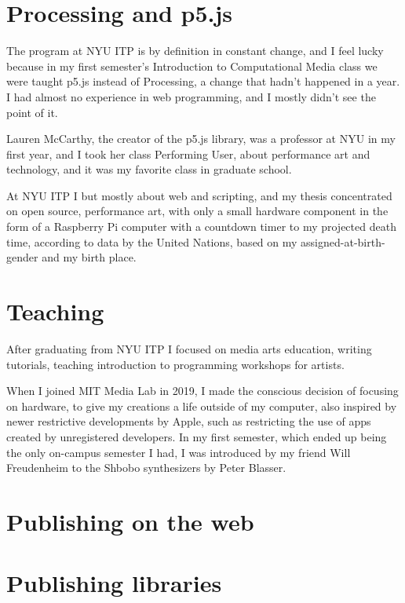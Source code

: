 \section{Processing and p5.js}

The program at \acrshort{NYU} \acrshort{ITP} is by definition in constant change, and I feel lucky because in my first semester's Introduction to Computational Media class we were taught p5.js instead of Processing, a change that hadn't happened in a year. I had almost no experience in web programming, and I mostly didn't see the point of it.

Lauren McCarthy, the creator of the p5.js library, was a professor at \acrshort{NYU} in my first year, and I took her class Performing User, about performance art and technology, and it was my favorite class in graduate school.

At \acrshort{NYU} \acrshort{ITP} I but mostly about web and scripting, and my thesis concentrated on open source, performance art, with only a small hardware component in the form of a Raspberry Pi computer with a countdown timer to my projected death time, according to data by the United Nations, based on my assigned-at-birth-gender and my birth place.

\section{Teaching}

After graduating from \acrshort{NYU} \acrshort{ITP} I focused on media arts education, writing tutorials, teaching introduction to programming workshops for artists.

When I joined MIT Media Lab in 2019, I made the conscious decision of focusing on hardware, to give my creations a life outside of my computer, also inspired by newer restrictive developments by Apple, such as restricting the use of apps created by unregistered developers. In my first semester, which ended up being the only on-campus semester I had, I was introduced by my friend Will Freudenheim to the Shbobo synthesizers by Peter Blasser.

\section{Publishing on the web}

\section{Publishing libraries}

